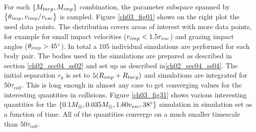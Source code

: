 For each $\{ M_{targ}, M_{imp} \}$ combination, the parameter subspace spanned by $\big\{ \theta_{imp}, v_{imp} / v_{esc} \big\}$ is sampled. Figure \ref{ch03_fig01} shows on the right plot the used data points. The distribution covers areas of interest with more data points, for example for small impact velocities ($v_{imp} < 1.5 v_{esc}$) and grazing impact angles ($\theta_{imp} > 45 ^\circ$). In total a 105 individual simulations are performed for each body pair. The bodies used in the simulations are prepared as described in section \ref{ch02_sec04_ss02} and set up as described in\ref{ch02_sec04_ss04}. The initial separation $r_0$ is set to $5 (R_{imp} + R_{targ})$ and simulations are integrated for $50 \tau_{coll}$. This is long enough in almost any case to get converging values for the interesting quantities in collisions. Figure \ref{ch03_fig31} shows various interesting quantities for the $\{0.1 M_{\oplus}, 0.035 M_{\oplus}, 1.60 v_{esc}, 38 ^\circ \}$ simulation in simulation set \css as a function of time. All of the quantities converge on a much smaller timescale than $50 \tau_{coll}$.
